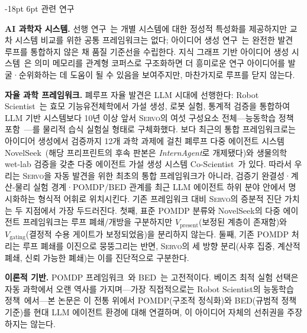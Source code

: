 \documentclass[11pt]{article}
\makeatletter
\renewcommand\section{\@startsection{section}{1}{\z@}%
  {-18pt \@plus -4pt \@minus -2pt}%
  {6pt \@plus 2pt}%
  {\normalfont\large\bfseries}}
\newcommand{\framework}{\textsc{Servo}}
\makeatother
\begin{document}
\section{관련 연구}
\label{sec:related}

\textbf{AI 과학자 시스템.} 선행 연구~\citep{lu2024aiscientist,lu2026aiscientist,schmidgall2025agentlab,boiko2023emergent}는 개별 시스템에 대한 정성적 특성화를 제공하지만 교차 시스템 비교를 위한 공통 프레임워크는 없다; 아이디어 생성 연구~\citep{si2024novelideas,baek2024researchagent}는 완전한 발견 루프를 통합하지 않은 채 품질 기준선을 수립한다. 지식 그래프 기반 아이디어 생성 시스템~\citep{gu2024scimuse,lee2025spacer}은 의미 메모리를 관계형 코퍼스로 구조화하면 더 흥미로운 연구 아이디어를 발굴·순위화하는 데 도움이 될 수 있음을 보여주지만, 마찬가지로 루프를 닫지 않는다.

\textbf{자율 과학 프레임워크.} 폐루프 자율 발견은 LLM 시대에 선행한다: Robot Scientist~\citep{sparkes2010robot}는 효모 기능유전체학에서 가설 생성, 로봇 실험, 통계적 검증을 통합하여 LLM 기반 시스템보다 10년 이상 앞서 \framework{}의 여섯 구성요소 전체---능동학습 정책 포함~\citep{king2004robot}---를 물리적 습식 실험실 형태로 구체화했다. 보다 최근의 통합 프레임워크로는 아이디어 생성에서 검증까지 12개 과학 과제에 걸친 폐루프 다중 에이전트 시스템 NovelSeek~\citep{zhang2025novelseek}(해당 프리프린트의 후속 판본은 \emph{InternAgent}로 개제됐다)와 생물의학 wet-lab 검증을 갖춘 다중 에이전트 가설 생성 시스템 Co-Scientist~\citep{gottweis2026coscientist}가 있다. 따라서 우리는 \framework{}을 자동 발견을 위한 최초의 통합 프레임워크가 아니라, 검증기 완결성·계산-물리 실험 경계·POMDP/BED 관계를 최근 LLM 에이전트 하위 분야 안에서 명시화하는 형식적 어휘로 위치시킨다. 기존 프레임워크 대비 \framework{}의 증분적 진단 가치는 두 지점에서 가장 두드러진다. 첫째, 표준 POMDP 분류와 NovelSeek의 다중 에이전트 프레임워크는 루프 폐쇄/개방을 구분하지만 $V_\text{present}$(보정된 계층이 존재함)와 $V_\text{gating}$(결정적 수용 게이트가 보정되었음)을 분리하지 않는다. 둘째, 기존 POMDP 처리는 루프 폐쇄를 이진으로 뭉뚱그리는 반면, \framework{}의 세 방향 분리(사후 집중, 계산적 폐쇄, 신뢰 가능한 폐쇄)는 이를 진단적으로 구분한다.

\textbf{이론적 기반.} POMDP 프레임워크~\citep{kaelbling1998pomdp}와 BED~\citep{chaloner1995bayesian,rainforth2024modern}는 고전적이다. 베이즈 최적 실험 선택은 자동 과학에서 오랜 역사를 가지며---가장 직접적으로는 Robot Scientist의 능동학습 정책~\citep{king2004robot}에서---본 논문은 이 전통 위에서 POMDP(구조적 정식화)와 BED(규범적 정책 기준)를 현대 LLM 에이전트 환경에 대해 연결하며, 이 아이디어 자체의 선취권을 주장하지는 않는다.
\end{document}
